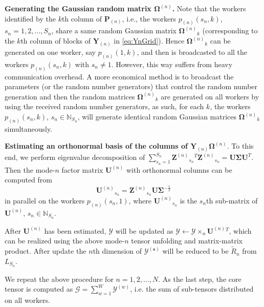 \documentclass[10pt,twocolumn,twoside]{IEEEtran}
\newcommand{\mat}[1]{\ensuremath{\mathbf{#1}}}
\newcommand{\tensor}[1]{\ensuremath{\boldsymbol{\mathscr{#1}}}}
\newcommand{\tenmat}[2][n]{\ensuremath{{\mathbf{#2}}_{(#1)}}}
\newcommand{\matn}[2][n]{\ensuremath{\mathbf{#2}^{(#1)}}}
\newcommand{\ttmn}[2][n]{\ensuremath{\times_{#1}\matn[#1]{{#2}}}}
\newcommand{\Natural}{\ensuremath{\mathbb{N}}}
\renewcommand{\from}{\ensuremath{\leftarrow}}
\begin{document}
{\bf Generating the Gaussian random matrix \matn{\Omega}.} Note that the workers identified by the $k$th column of \tenmat{P}, i.e., the  workers $p_{(n)}(s_n,k)$, $s_n=1,2,\ldots, S_n$, share a same random Gaussian matrix $\matn{\Omega}_k$ (corresponding to the $k$th column of blocks of \tenmat{Y} in \eqref{eq:YnGrid}).  Hence $\matn{\Omega}_k$ can be generated on one worker, say $p_{(n)}(1,k)$, and then is broadcasted to all the workers $p_{(n)}(s_n,k)$ with $s_n\neq 1$. However, this way  suffers from heavy communication overhead. A more economical method is to broadcast the parameters (or the random number generators) that control the random number generation and then the random matrices $\matn{\Omega}_k$ are generated on all workers by using the received random number generators, as such, for each $k$, the workers $p_{(n)}(s_n,k)$, $s_n\in\Natural_{S_n}$, will generate identical random Gaussian matrices $\matn{\Omega}_k$ simultaneously. 

{\bf Estimating an orthonormal basis of the columns of $\tenmat{Y}\matn{\Omega}$}. To this end, we perform eigenvalue decomposition of $\sum_{s_n=1}^{S_n}\matn{Z}_{s_n}{}^T\matn{Z}_{s_n}=\mat{U\Sigma}\mat{U}^T$. Then the mode-$n$ factor matrix \matn{U} with orthonormal columns can be computed from
\begin{equation}
\label{eq:DRTAn}
\matn{U}_{s_n}=\matn{Z}_{s_n}\mat{U}\mat{\Sigma}^{-\frac{1}{2}}
\end{equation}
in parallel on the workers $p_{(n)}(s_n,1)$, where $\matn{U}_{s_n}$ is the $s_n$th sub-matrix of \matn{U}, $s_n\in\Natural_{S_n}$.


After \matn{U} has been estimated, \tensor{Y} will be updated as $\tensor{Y}\from\tensor{Y}\ttmn{{U}}{}^T$, which can be realized  using the above mode-$n$ tensor unfolding and matrix-matrix product. After update the $n$th dimension of $\tensor{Y}^{(\mat{s})}$ will be reduced to be $\tilde{R}_n$ from $L_{S_n}$.

We repeat the above procedure for $n=1,2,\ldots,N$. As the last step, the core tensor is computed as $\tensor{G}=\sum_{w=1}^W\tensor{Y}^{(w)}$, i.e. the sum of sub-tensors distributed on all workers.
\end{document}
